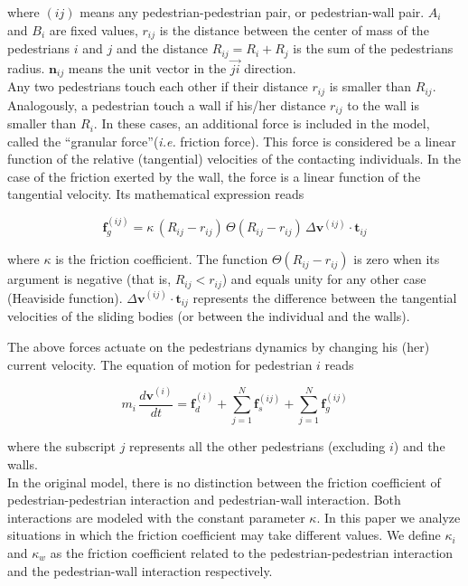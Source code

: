 where $(ij)$ means any pedestrian-pedestrian pair, or pedestrian-wall 
pair. $A_i$ and $B_i$ are fixed values, $r_{ij}$ is the distance between  the 
center of mass of the pedestrians $i$ and $j$ and the distance $R_{ij}=R_i+R_j$ 
is the sum of the pedestrians radius. $\mathbf{n}_{ij}$ means the unit vector in 
the $\vec{ji}$ direction.\\

Any two pedestrians touch each other if their distance $r_{ij}$ is smaller than 
$R_{ij}$. Analogously, a pedestrian touch a wall if his/her distance $r_{ij}$ to the wall is smaller than $R_i$. In these cases, an additional force is included in the model, called the ``granular force''(\textit{i.e.} friction force). This force is considered be a linear function of the relative (tangential) velocities of the contacting individuals. In the case of the friction exerted by the wall, the force is a linear function of the tangential velocity. %
Its mathematical expression reads 

\begin{equation}
        \mathbf{f}_g^{(ij)} = 
\kappa\,(R_{ij}-r_{ij})\,\Theta(R_{ij}-r_{ij})\,\Delta
\mathbf{v}^{(ij)}\cdot\mathbf{t}_{ij} 
        \label{granular}
\end{equation}

where $\kappa$ is the friction coefficient. The function 
$\Theta(R_{ij}-r_{ij})$ is zero when its argument is negative (that is, 
$R_{ij}<r_{ij}$) and equals unity for any other case (Heaviside function). 
$\Delta\mathbf{v}^{(ij)}\cdot\mathbf{t}_{ij}$ represents the difference between 
the tangential velocities of the sliding bodies (or between the individual and 
the walls).   

The above forces actuate on the pedestrians dynamics by changing his (her) 
current velocity. The equation of motion for pedestrian $i$ reads

\begin{equation}
m_i\,\displaystyle\frac{d\mathbf{v}^{(i)}}{dt}=\mathbf{f}_d^{(i)}
+\displaystyle\sum_{j=1}^{N}\displaystyle\mathbf{f}_s^{(ij)}
+\displaystyle\sum_ {
j=1}^{N}\mathbf{f}_g^{(ij)}\label{eq_mov}
\end{equation}

where the subscript $j$ represents all the other pedestrians 
(excluding $i$) and the walls.\\

In the original model, there is no distinction between the friction coefficient of pedestrian-pedestrian interaction and pedestrian-wall interaction. Both interactions are modeled with the constant parameter $\kappa$. In this paper we analyze situations in which the friction coefficient may take different values. We define $\kappa_i$ and $\kappa_w$ as the friction coefficient related to the pedestrian-pedestrian interaction and the pedestrian-wall interaction respectively. 

